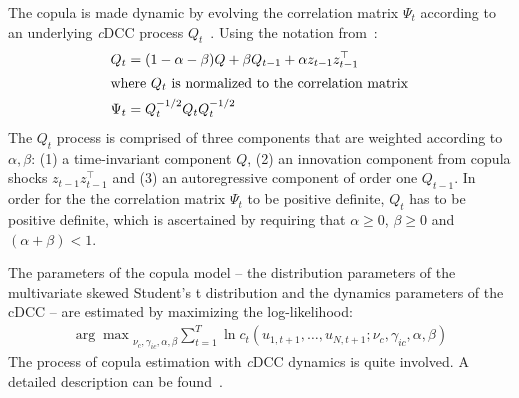 
The copula is made dynamic by evolving the correlation matrix $\Psi_t$ according to an underlying \emph{c}DCC process $Q_t$~\autocites[cf.]{Engle2002,Aielli2013}. Using the notation from~\autocite{ChristoffersenLanglois2013}:
\begin{align}
  Q_t &= (1 - \alpha - \beta) Q
    + \beta Q_{t - 1}
    + \alpha z_{t - 1} z_{t - 1}^\top \\
  \intertext{where $Q_t$ is normalized to the correlation matrix}
  \Psi_t &= Q_t^{-1/2} Q_t Q_t^{-1/2}
\end{align}
The $Q_t$ process is comprised of three components that are weighted according to $\alpha, \beta$: (1) a time-invariant component $Q$, (2) an innovation component from copula shocks $z_{t-1} z_{t-1}^\top$ and (3) an autoregressive component of order one $Q_{t-1}$. In order for the the correlation matrix $\Psi_t$ to be positive definite, $Q_t$ has to be positive definite, which is ascertained by requiring that $\alpha \geq 0$, $\beta \geq 0$ and $(\alpha + \beta) < 1$.


The parameters of the copula model -- the distribution parameters of the multivariate skewed Student's t distribution and the dynamics parameters of the cDCC -- are estimated by maximizing the log-likelihood:
\begin{align}
  {\arg\max}_{\nu_c, \gamma_{ic}, \alpha, \beta} \sum_{t = 1}^T \ln c_t(u_{1, t+1}, \ldots, u_{N, t+1}; \nu_c, \gamma_{ic}, \alpha, \beta)
\end{align}
The process of copula estimation with \emph{c}DCC dynamics is quite involved. A detailed description can be found~.


